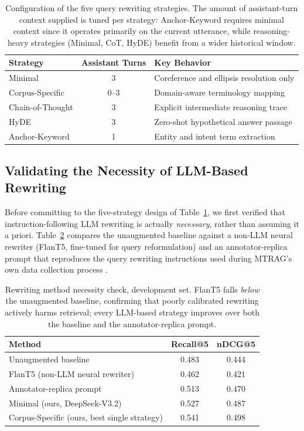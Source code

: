 \begin{table}[h]
\centering
\small
\begin{tabular}{lcl}
\toprule
\textbf{Strategy} & \textbf{Assistant Turns} & \textbf{Key Behavior} \\
\midrule
Minimal & 3 & Coreference and ellipsis resolution only \\
Corpus-Specific & 0--3 & Domain-aware terminology mapping \\
Chain-of-Thought & 3 & Explicit intermediate reasoning trace \\
HyDE & 3 & Zero-shot hypothetical answer passage \\
Anchor-Keyword & 1 & Entity and intent term extraction \\
\bottomrule
\end{tabular}
\caption{Configuration of the five query rewriting strategies. The amount of assistant-turn context supplied is tuned per strategy: Anchor-Keyword requires minimal context since it operates primarily on the current utterance, while reasoning-heavy strategies (Minimal, CoT, HyDE) benefit from a wider historical window.}
\label{tab:rewrite-config-en}
\end{table}

\subsection{Validating the Necessity of LLM-Based Rewriting}
\label{subsec:rewriting-necessity}

Before committing to the five-strategy design of Table~\ref{tab:rewrite-config-en}, we first verified
that instruction-following LLM rewriting is actually \emph{necessary}, rather than assuming it a
priori. Table~\ref{tab:rewrite-necessity-en} compares the unaugmented baseline against a non-LLM
neural rewriter (FlanT5, fine-tuned for query reformulation) and an annotator-replica prompt that
reproduces the query rewriting instructions used during MTRAG's own data collection process
\citep{katsis2025mtrag}.

\begin{table}[h]
\centering
\small
\begin{tabular}{lcc}
\toprule
\textbf{Method} & \textbf{Recall@5} & \textbf{nDCG@5} \\
\midrule
Unaugmented baseline & 0.483 & 0.444 \\
FlanT5 (non-LLM neural rewriter) & 0.462 & 0.421 \\
Annotator-replica prompt & 0.513 & 0.470 \\
Minimal (ours, DeepSeek-V3.2) & 0.527 & 0.487 \\
Corpus-Specific (ours, best single strategy) & 0.541 & 0.498 \\
\bottomrule
\end{tabular}
\caption{Rewriting method necessity check, development set. FlanT5 falls \emph{below} the unaugmented
baseline, confirming that poorly calibrated rewriting actively harms retrieval; every LLM-based
strategy improves over both the baseline and the annotator-replica prompt.}
\label{tab:rewrite-necessity-en}
\end{table}

